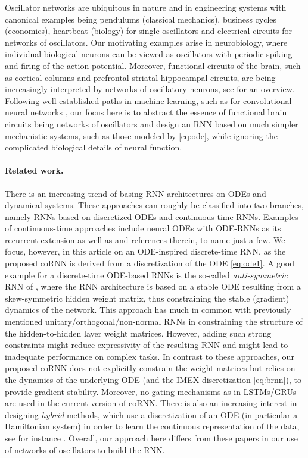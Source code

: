 \documentclass{article} \usepackage{iclr2021_conference,times}
\begin{document}
Oscillator networks are ubiquitous in nature and in engineering systems \citep{GHbook,stgz2} with canonical examples being pendulums (classical mechanics), business cycles (economics), heartbeat (biology) for single oscillators and electrical circuits for networks of oscillators. Our motivating examples arise in neurobiology, where individual biological neurons can be viewed as oscillators with periodic spiking and firing of the action potential. Moreover, functional circuits of the brain, such as cortical columns and prefrontal-striatal-hippocampal circuits, are being increasingly interpreted by networks of oscillatory neurons, see \cite{ermen1} for an overview. Following well-established paths in machine learning, such as for convolutional neural networks \citep{DLnat}, our focus here is to abstract the essence of functional brain circuits being networks of oscillators and design an RNN based on much simpler mechanistic systems, such as those modeled by \eqref{eq:ode}, while ignoring the complicated biological details of neural function.

\paragraph{Related work.} There is an increasing trend of basing RNN architectures on ODEs and dynamical systems. These approaches can roughly be classified into two branches, namely RNNs based on discretized ODEs and continuous-time RNNs. Examples of continuous-time approaches include neural ODEs \citep{neuralODE} with ODE-RNNs \citep{ode_rnn} as its recurrent extension as well as \cite{E} and references therein, to name just a few.
We focus, however, in this article on an ODE-inspired discrete-time RNN, as the proposed coRNN is derived from a discretization of the ODE \eqref{eq:ode1}. A good example for a discrete-time ODE-based RNNs is the so-called \emph{anti-symmetric} RNN of \cite{anti}, where the RNN architecture is based on a stable ODE resulting from a skew-symmetric hidden weight matrix, thus constraining the stable (gradient) dynamics of the network. This approach has much in common with previously mentioned unitary/orthogonal/non-normal RNNs in constraining the structure of the hidden-to-hidden layer weight matrices. However, adding such strong constraints might reduce expressivity of the resulting RNN and might lead to inadequate performance on complex tasks. In contrast to these approaches, our proposed coRNN does not explicitly constrain the weight matrices but relies on the dynamics of the underlying ODE (and the IMEX discretization \eqref{eq:brnn}), to provide gradient stability. Moreover, no gating mechanisms as in LSTMs/GRUs are used in the current version of coRNN. There is also an increasing interest in designing \emph{hybrid} methods, which use a discretization of an ODE (in particular a Hamiltonian system) in order to learn the continuous representation of the data, see for instance \cite{hnn,srnn}. Overall, our approach here differs from these papers in our use of networks of oscillators to build the RNN.
\end{document}
